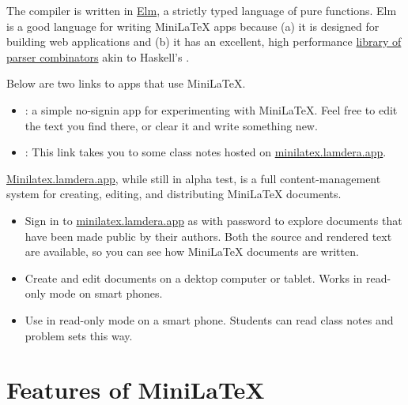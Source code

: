 The compiler is written in \href{https://elm-lang.org}{Elm}, a strictly typed language of pure functions.  Elm is a good language for writing MiniLaTeX apps because (a) it is designed for building web applications and (b) it has an excellent, high performance  \href{https://package.elm-lang.org/packages/elm/parser/latest/}{library of parser combinators} akin to Haskell's .



Below are two links to  apps that use  MiniLaTeX.  

\begin{itemize}

\item {}: a simple no-signin app for experimenting with MiniLaTeX.  Feel free to edit the text you find there, or clear it and write something new.

\item {}:  This link takes you to some class notes
hosted on \href{https://minilatex.lamdera.app}{minilatex.lamdera.app}.

\end{itemize}

\href{https://minilatex.lamdera.app}{Minilatex.lamdera.app}, while still in alpha test, is a full content-management system for creating, editing, and distributing MiniLaTeX documents.

\begin{itemize}

\item {} Sign in to \href{https://minilatex.lamdera.app}{minilatex.lamdera.app}
as  with password  to explore documents that have been made public by their authors.  Both the source and rendered text are available, so you can see how MiniLaTeX documents are written. 

\item {} Create and edit documents on a dektop computer or tablet. Works in read-only mode on smart phones.

\item {} Use in read-only mode on a smart phone. Students can read class notes and problem sets this way.

\end{itemize}


\section{Features of MiniLaTeX}

